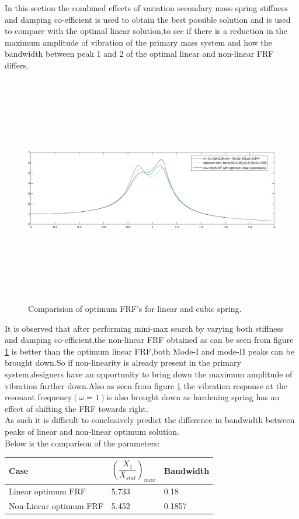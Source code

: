 In this section the combined effects of variation secondary mass spring stiffness and damping co-efficient is used to obtain the best possible solution and is used to compare with the optimal linear solution,to see if there is a reduction in the maximum amplitude of vibration of the primary mass system and how the bandwidth between peak 1 and 2 of the optimal linear and non-linear FRF differs.
\begin{figure}[h!]
\includegraphics[width=16cm,height=10cm]{"figures/nonlinearity_primaryymass_1"}
\caption{Comparision of optimum FRF's for linear and cubic spring.}
  \label{fig:optimum FRF}
\end{figure}
It is observed that after performing mini-max search by varying both stiffness and damping co-efficient,the non-linear FRF obtained as can be seen from figure \ref{fig:optimum FRF} is better than the optimum linear FRF,both Mode-I and mode-II peaks can be brought down.So if non-linearity is already present in the primary system,designers have an opportunity to bring down the maximum amplitude of vibration further down.Also as seen from figure \ref{fig:optimum FRF} the vibration response at the resonant frequency$(\omega=1)$is also brought down as hardening spring has an effect of shifting the FRF towards right.\\
As such it is difficult to conclusively predict the difference in bandwidth between peaks of linear and non-linear optimum solution.\\
Below is the comparison of the parameters:
\begin{table}[h!]
\centering
\begin{tabular}{|m{6cm}|m{2cm}|m{2cm}|} 
\hline
Case& $\left(\dfrac{X_{1}}{X_{stat}}\right)_{max}$ & Bandwidth \\
\hline
Linear optimum FRF & 5.733 & 0.18 

\\
\hline
Non-Linear optimum FRF & 5.452 & 0.1857

 \\ 
\hline
\end{tabular}
\end{table}
